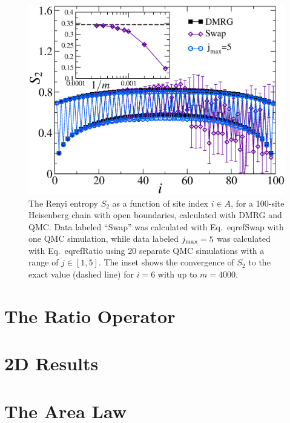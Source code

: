 \begin{figure} {
\includegraphics[width=6.2in]{./figures/paper2/fig_1D/L100_fig2.eps} 
\centering
\caption[Renyi for 100 site chain]{ 
\label{1Dfig}
{\color{red}
The Renyi entropy $S_2$ as a function of site index $i \in A$, for a 100-site Heisenberg chain with open boundaries, 
calculated with DMRG and QMC.  Data labeled ``Swap'' was calculated with Eq.~eqref{Swap} with one QMC simulation, while
data labeled $j_{\rm max}=5$ was calculated with Eq.~eqref{Ratio} using 20 separate QMC simulations with a range of  $j \in [1,5]$.  The inset shows the convergence of $S_2$ to the exact value (dashed line) for $i=6$ with up to $m=4000$.
}
}
} 

\end{figure}

\section{The Ratio Operator}

\section{2D Results}

\section{The Area Law}
